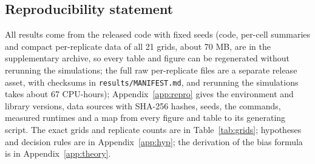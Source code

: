 \subsection*{Reproducibility statement}
All results come from the released code with fixed seeds (code, per-cell summaries and compact per-replicate data of all 21 grids, about 70 MB, are in the supplementary archive, so every table and figure can be regenerated without rerunning the simulations; the full raw per-replicate files are a separate release asset, with checksums in \texttt{results/MANIFEST.md}, and rerunning the simulations takes about 67 CPU-hours); Appendix~\ref{app:repro} gives the environment and library versions, data sources with SHA-256 hashes, seeds, the commands, measured runtimes and a map from every figure and table to its generating script. The exact grids and replicate counts are in Table~\ref{tab:grids}; hypotheses and decision rules are in Appendix~\ref{app:hyp}; the derivation of the bias formula is in Appendix~\ref{app:theory}.
